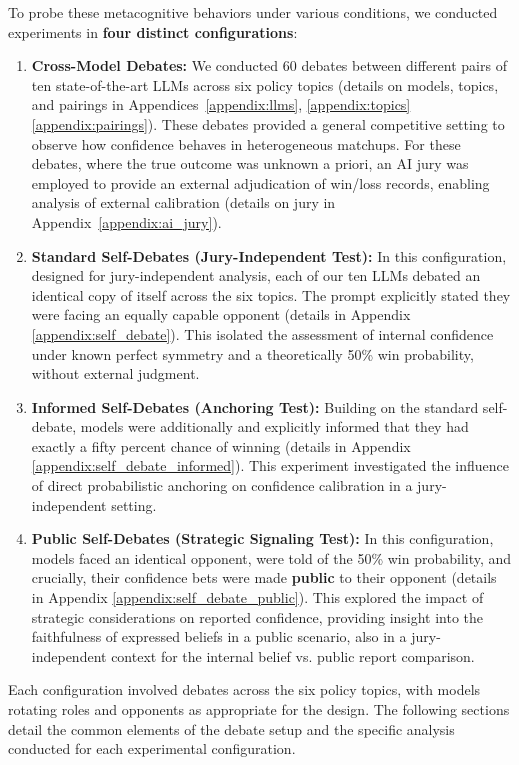 \documentclass{article}
\begin{document}
To probe these metacognitive behaviors under various conditions, we conducted experiments in \textbf{four distinct configurations}:

\begin{enumerate}
    \item \textbf{Cross-Model Debates:} We conducted 60 debates between different pairs of ten state-of-the-art LLMs across six policy topics (details on models, topics, and pairings in Appendices~\ref{appendix:llms}, \ref{appendix:topics} \ref{appendix:pairings}). These debates provided a general competitive setting to observe how confidence behaves in heterogeneous matchups. For these debates, where the true outcome was unknown a priori, an AI jury was employed to provide an external adjudication of win/loss records, enabling analysis of external calibration (details on jury in Appendix~\ref{appendix:ai_jury}).

    \item \textbf{Standard Self-Debates (Jury-Independent Test):} In this configuration, designed for jury-independent analysis, each of our ten LLMs debated an identical copy of itself across the six topics. The prompt explicitly stated they were facing an equally capable opponent (details in Appendix \ref{appendix:self_debate}). This isolated the assessment of internal confidence under known perfect symmetry and a theoretically 50\% win probability, without external judgment.

    \item \textbf{Informed Self-Debates (Anchoring Test):} Building on the standard self-debate, models were additionally and explicitly informed that they had exactly a fifty percent chance of winning (details in Appendix \ref{appendix:self_debate_informed}). This experiment investigated the influence of direct probabilistic anchoring on confidence calibration in a jury-independent setting.

    \item \textbf{Public Self-Debates (Strategic Signaling Test):} In this configuration, models faced an identical opponent, were told of the 50\% win probability, and crucially, their confidence bets were made \textbf{public} to their opponent (details in Appendix \ref{appendix:self_debate_public}). This explored the impact of strategic considerations on reported confidence, providing insight into the faithfulness of expressed beliefs in a public scenario, also in a jury-independent context for the internal belief vs. public report comparison.
\end{enumerate}
Each configuration involved debates across the six policy topics, with models rotating roles and opponents as appropriate for the design. The following sections detail the common elements of the debate setup and the specific analysis conducted for each experimental configuration.
\end{document}
